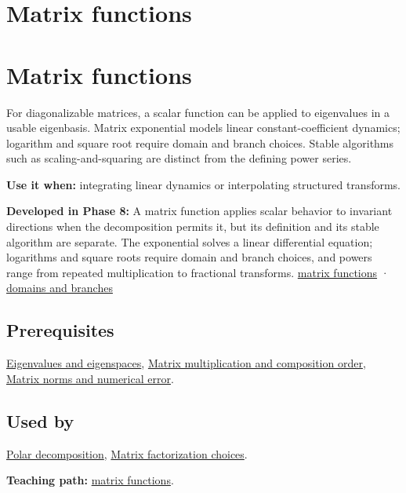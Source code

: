 \hypertarget{appendix-0f4bc2bf2b1f}{}
\section*{Matrix functions}
\section{Matrix functions}\label{matrix-functions}

For diagonalizable matrices, a scalar function can be applied to eigenvalues in a usable eigenbasis. Matrix exponential models linear constant-coefficient dynamics; logarithm and square root require domain and branch choices. Stable algorithms such as scaling-and-squaring are distinct from the defining power series.

\textbf{Use it when:} integrating linear dynamics or interpolating structured transforms.

\textbf{Developed in Phase 8:} A matrix function applies scalar behavior to invariant directions when the decomposition permits it, but its definition and its stable algorithm are separate. The exponential solves a linear differential equation; logarithms and square roots require domain and branch choices, and powers range from repeated multiplication to fractional transforms. \href{Continuous\%20Notes/Computing\%20Foundations\%20-\%20From\%20Bits\%20to\%20C++\%20and\%20Systems\%20APIs\#Matrix\%20functions\%20turn\%20repeated\%20linear\%20actions\%20into\%20one\%20operator}{matrix functions} · \href{Continuous\%20Notes/Computing\%20Foundations\%20-\%20From\%20Bits\%20to\%20C++\%20and\%20Systems\%20APIs\#Logarithms\%20and\%20square\%20roots\%20need\%20domains\%20and\%20branches}{domains and branches}

\subsection{Prerequisites}\label{prerequisites}

\hyperref[appendix-0b3be18411f9]{Eigenvalues and eigenspaces}, \hyperref[appendix-ab31ef447dbf]{Matrix multiplication and composition order}, \hyperref[appendix-f8657bac66e5]{Matrix norms and numerical error}.

\subsection{Used by}\label{used-by}

\hyperref[appendix-73f5bcf7a462]{Polar decomposition}, \hyperref[appendix-221a483bec2d]{Matrix factorization choices}.

\textbf{Teaching path:} \href{Continuous\%20Notes/Computing\%20Foundations\%20-\%20From\%20Bits\%20to\%20C++\%20and\%20Systems\%20APIs\#Matrix\%20functions\%20turn\%20repeated\%20linear\%20actions\%20into\%20one\%20operator}{matrix functions}.
